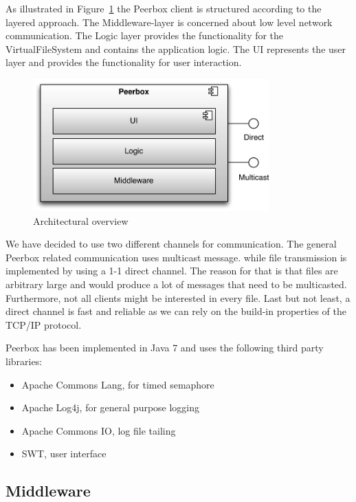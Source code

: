
As illustrated in Figure~\ref{fig:figures_archOverview} the Peerbox client is structured according to the layered approach. The Middleware-layer is concerned about low level network communication. The Logic layer provides the functionality for the VirtualFileSystem and contains the application logic. The UI represents the user layer and provides the functionality for user interaction.

\begin{figure}[htbp]
    \centering
        \includegraphics[height=2in]{figures/archOverview.pdf}
    \caption{Architectural overview}
    \label{fig:figures_archOverview}
\end{figure}

We have decided to use two different channels for communication. The general Peerbox related communication uses multicast message. while file transmission is implemented by using a 1-1 direct channel. 
The reason for that is that files are arbitrary large and would produce a lot of messages that need to be multicasted. Furthermore, not all clients might be interested in every file. Last but not least, a direct channel is fast and reliable as we can rely on the build-in properties of the TCP/IP protocol.

Peerbox has been implemented in Java 7 and uses the following third party libraries: 
\begin{itemize}
    \item Apache Commons Lang, for timed semaphore
    \item Apache Log4j, for general purpose logging
    \item Apache Commons IO, log file tailing
    \item SWT, user interface
\end{itemize}

\subsection{Middleware}

